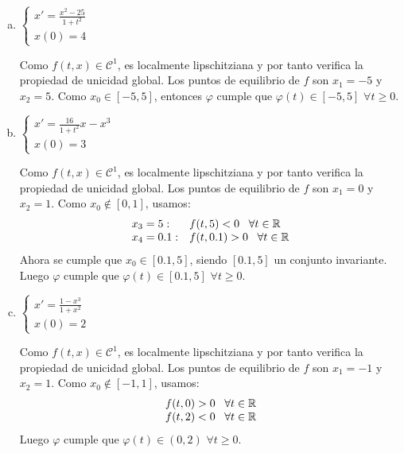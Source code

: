 \documentclass[12pt]{article}
\theoremstyle{definition}
\theoremstyle{remark}
\begin{document}
\begin{enumerate}[(a)]
\item $
\left\{
\begin{array}{l}
x'=\frac{x^2-25}{1+t^2}\\
x(0)=4
\end{array}
\right.
$

Como $f(t,x)\in\mathcal{C}^1$, es localmente lipschitziana y por tanto verifica la propiedad de unicidad global. Los puntos de equilibrio de $f$ son $x_1=-5$ y $x_2=5$. Como $x_0\in[-5,5]$, entonces $\varphi$ cumple que $\varphi(t)\in[-5,5]$ $\forall t\geq 0$.
\item $
\left\{
\begin{array}{l}
x'=\frac{16}{1+t^2}x-x^3\\
x(0)=3
\end{array}
\right.
$

Como $f(t,x)\in\mathcal{C}^1$, es localmente lipschitziana y por tanto verifica la propiedad de unicidad global. Los puntos de equilibrio de $f$ son $x_1=0$ y $x_2=1$. Como $x_0\notin[0,1]$, usamos:
\[
\begin{array}{ll}
x_3=5:& f(t,5)<0 \;\;\; \forall t\in\mathbb{R}\\
x_4=0.1: & f(t,0.1)>0 \;\;\; \forall t\in\mathbb{R}
\end{array}
\]
Ahora se cumple que $x_0\in[0.1,5]$, siendo $[0.1,5]$ un conjunto invariante. Luego $\varphi$ cumple que $\varphi(t)\in[0.1,5]$ $\forall t\geq 0$.

\item $
\left\{
\begin{array}{l}
x'=\frac{1-x^3}{1+x^2}\\
x(0)=2
\end{array}
\right.
$

Como $f(t,x)\in\mathcal{C}^1$, es localmente lipschitziana y por tanto verifica la propiedad de unicidad global. Los puntos de equilibrio de $f$ son $x_1=-1$ y $x_2=1$. Como $x_0\notin[-1,1]$, usamos:
\[
\begin{array}{ll}
f(t,0)>0 \;\;\; \forall t\in\mathbb{R}\\
f(t,2)<0 \;\;\; \forall t\in\mathbb{R}
\end{array}
\]
Luego $\varphi$ cumple que $\varphi(t)\in(0,2)$ $\forall t\geq 0$.

\end{enumerate}
\end{document}

